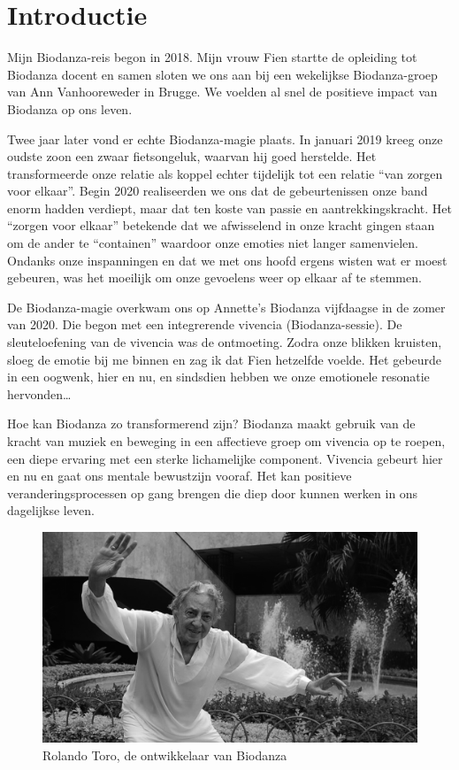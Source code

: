 \documentclass[
  11pt,
]{book}
\begin{document}
\hypertarget{intro}{%
\chapter{Introductie}\label{intro}}

Mijn Biodanza-reis begon in 2018. Mijn vrouw Fien startte de opleiding tot Biodanza docent en samen sloten we ons aan bij een wekelijkse Biodanza-groep van Ann Vanhooreweder in Brugge. We voelden al snel de positieve impact van Biodanza op ons leven.

Twee jaar later vond er echte Biodanza-magie plaats. In januari 2019 kreeg onze oudste zoon een zwaar fietsongeluk, waarvan hij goed herstelde. Het transformeerde onze relatie als koppel echter tijdelijk tot een relatie ``van zorgen voor elkaar''. Begin 2020 realiseerden we ons dat de gebeurtenissen onze band enorm hadden verdiept, maar dat ten koste van passie en aantrekkingskracht. Het ``zorgen voor elkaar'' betekende dat we afwisselend in onze kracht gingen staan om de ander te ``containen'' waardoor onze emoties niet langer samenvielen. Ondanks onze inspanningen en dat we met ons hoofd ergens wisten wat er moest gebeuren, was het moeilijk om onze gevoelens weer op elkaar af te stemmen.

De Biodanza-magie overkwam ons op Annette's Biodanza vijfdaagse in de zomer van 2020. Die begon met een integrerende vivencia (Biodanza-sessie). De sleuteloefening van de vivencia was de ontmoeting. Zodra onze blikken kruisten, sloeg de emotie bij me binnen en zag ik dat Fien hetzelfde voelde. Het gebeurde in een oogwenk, hier en nu, en sindsdien hebben we onze emotionele resonatie hervonden\ldots{}

Hoe kan Biodanza zo transformerend zijn? Biodanza maakt gebruik van de kracht van muziek en beweging in een affectieve groep om vivencia op te roepen, een diepe ervaring met een sterke lichamelijke component. Vivencia gebeurt hier en nu en gaat ons mentale bewustzijn vooraf. Het kan positieve veranderingsprocessen op gang brengen die diep door kunnen werken in ons dagelijkse leven.

\begin{figure}

{\centering \includegraphics[width=0.45\linewidth]{./figs/rolando} 

}

\caption{Rolando Toro, de ontwikkelaar van Biodanza}\label{fig:rolandoToro}
\end{figure}
\end{document}
